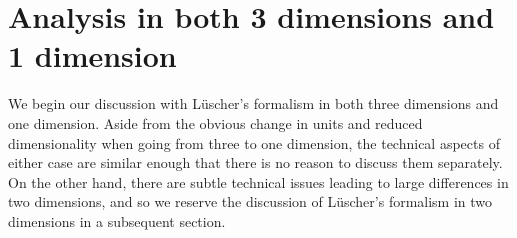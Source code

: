 \section{Analysis in both 3 dimensions and 1 dimension}
We begin our discussion with L\"uscher's formalism in both three dimensions and one dimension.  Aside from the obvious change in units and reduced dimensionality when going from three to one dimension, the technical aspects of either case are similar enough that there is no reason to discuss them separately.  On the other hand, there are subtle technical issues leading to large differences in two dimensions, and so we reserve the discussion of L\"uscher's formalism in two dimensions in a subsequent section.  